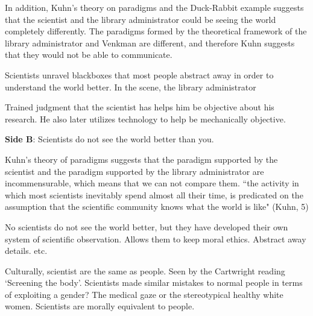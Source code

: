 \documentclass[11pt, oneside]{article}
\begin{document}
\par In addition, Kuhn's theory on paradigms and the Duck-Rabbit example suggests that the scientist and the library administrator could be seeing the world completely differently. The paradigms formed by the theoretical framework of the library administrator and Venkman are different, and therefore Kuhn suggests that they would not be able to communicate. 


\par Scientists unravel blackboxes that most people abstract away in order to understand the world better. In the scene, the library administrator 

\par Trained judgment that the scientist has helps him be objective about his research. He also later utilizes technology to help be mechanically objective. 

\newpage

\noindent \textbf{Side B}: Scientists do not see the world better than you.


\par Kuhn's theory of paradigms suggests that the paradigm supported by the scientist and the paradigm supported by the library administrator are incommensurable, which means that we can not compare them. ``the activity in which most scientists inevitably spend almost all their time, is predicated on the assumption that the scientific community knows what the world is like" (Kuhn, 5)

\par No scientists do not see the world better, but they have developed their own system of scientific observation. Allows them to keep moral ethics. Abstract away details. etc.

\par Culturally, scientist are the same as people. Seen by the Cartwright reading `Screening the body'. Scientists made similar mistakes to normal people in terms of exploiting a gender? The medical gaze or the stereotypical healthy white women. Scientists are morally equivalent to people. 

\end{document}
